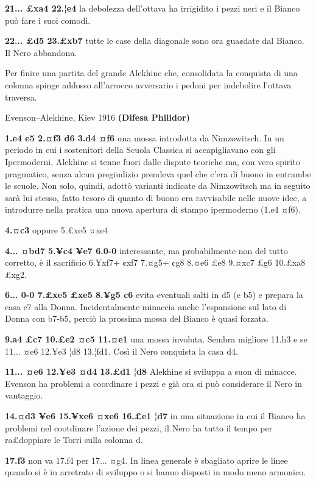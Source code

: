 \textbf{21... £xa4 22.¦e4} la debolezza dell'ottava ha irrigidito i
pezzi neri e il Bianco può fare i suoi comodi.

\textbf{22... £d5 23.£xb7} tutte le case della diagonale sono ora
gua¢date dal Bianco. Il Nero abbandona.

Per finire una partita del grande Alekhine che, consolidata la conquista
di una colonna spinge addosso all'arrocco avversario i pedoni per
indebolire l'ottava traversa.

Evenson--Alekhine, Kiev 1916 \textbf{(Difesa Philidor)}

\textbf{1.e4 e5 2.¤f3 d6 3.d4 ¤f6} una mossa introdotta da Nimzowitsch.
In un periodo in cui i sostenitori della Scuola Classica si
accapigliavano con gli Ipermoderni, Alekhine si tenne fuori dalle
dispute teoriche ma, con vero spirito pragmatico, senza alcun
pregiudizio prendeva quel che c'era di buono in entrambe le scuole. Non
solo, quindi, adottò varianti indicate da Nimzowitsch ma in seguito sarà
lui stesso, fatto tesoro di quanto di buono era ravvisabile nelle nuove
idee, a introdurre nella pratica una nuova apertura di stampo
ipermoderno (1.e4 ¤f6).

\textbf{4.¤c3} oppure 5.£xe5 ¤xe4

\textbf{4... ¤bd7 5.¥c4 ¥e7 6.0-0} interessante, ma probabilmente non
del tutto corretto, è il sacrificio 6.¥xf7+ ¢xf7 7.¤g5+ ¢g8 8.¤e6 £e8
9.¤xc7 £g6 10.£xa8 £xg2.

\textbf{6... 0-0 7.£xe5 £xe5 8.¥g5 c6} evita eventuali salti in d5 (e
b5) e prepara la casa c7 alla Donna. Incidentalmente minaccia anche
l'espansione sul lato di Donna con b7-b5, perciò la prossima mossa del
Bianco è quasi forzata.

\textbf{9.a4 £c7 10.£e2 ¤c5 11.¤e1} una mossa involuta. Sembra migliore
11.h3 e se 11... ¤e6 12.¥e3 ¦d8 13.¦fd1. Così il Nero conquista la casa
d4.

\textbf{11... ¤e6 12.¥e3 ¤d4 13.£d1 ¦d8} Alekhine si sviluppa a suon di
minacce. Evenson ha problemi a coordinare i pezzi e già ora si può
considerare il Nero in vantaggio.

\textbf{14.¤d3 ¥e6 15.¥xe6 ¤xe6 16.£e1 ¦d7} in una situazione in cui il
Bianco ha problemi nel cootdinare l'azione dei pezzi, il Nero ha tutto
il tempo per ra£doppiare le Torri sulla colonna d.

\textbf{17.f3} non va 17.f4 per 17... ¤g4. In linea generale è sbagliato
aprire le linee quando si è in arretrato di sviluppo o si hanno disposti
in modo meno armonico.

